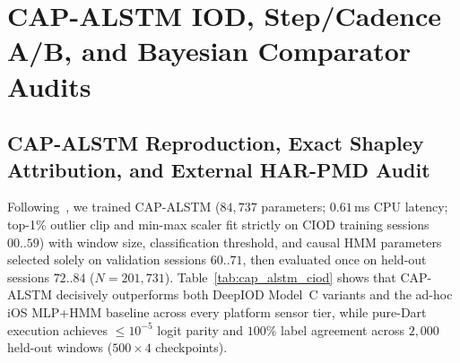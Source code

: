 \section{CAP-ALSTM IOD, Step/Cadence A/B, and Bayesian Comparator Audits}
\label{sec:eval_scientific_audits}

\subsection{CAP-ALSTM Reproduction, Exact Shapley Attribution, and External HAR-PMD Audit}
Following~\cite{bakirtzis2022ciod}, we trained CAP-ALSTM ($84{,}737$ parameters; $0.61$\,ms CPU latency; top-1\% outlier clip and min-max scaler fit strictly on CIOD training sessions $00..59$) with window size, classification threshold, and causal HMM parameters selected solely on validation sessions $60..71$, then evaluated once on held-out sessions $72..84$ ($N=201{,}731$). Table~\ref{tab:cap_alstm_ciod} shows that CAP-ALSTM decisively outperforms both DeepIOD Model~C variants and the ad-hoc iOS MLP+HMM baseline across every platform sensor tier, while pure-Dart execution achieves $\le 10^{-5}$ logit parity and $100\%$ label agreement across $2{,}000$ held-out windows ($500 \times 4$ checkpoints).

\begin{table}[htbp]
\centering
\caption{Held-out Cambridge CIOD benchmark (Sessions $72..84$, $N=201{,}731$) comparing CAP-ALSTM sensor tiers against existing Aetron baselines.}
\label{tab:cap_alstm_ciod}
\end{table}

